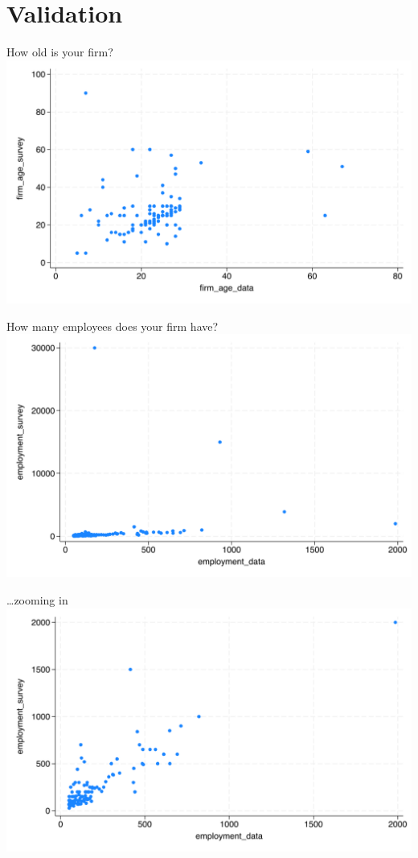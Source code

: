 \documentclass[
  ignorenonframetext,
  aspectratio=1610,
]{beamer}
\begin{document}
\section{Validation}\label{validation}

\begin{frame}{How old is your firm?}
\protect\hypertarget{how-old-is-your-firm}{}
\includegraphics{fig/firm_age_validation.png}
\end{frame}

\begin{frame}{How many employees does your firm have?}
\protect\hypertarget{how-many-employees-does-your-firm-have}{}
\includegraphics{fig/employment_validation.png}
\end{frame}

\begin{frame}{\ldots zooming in}
\protect\hypertarget{zooming-in}{}
\includegraphics{fig/employment_validation_cleaned.png}
\end{frame}
\end{document}
